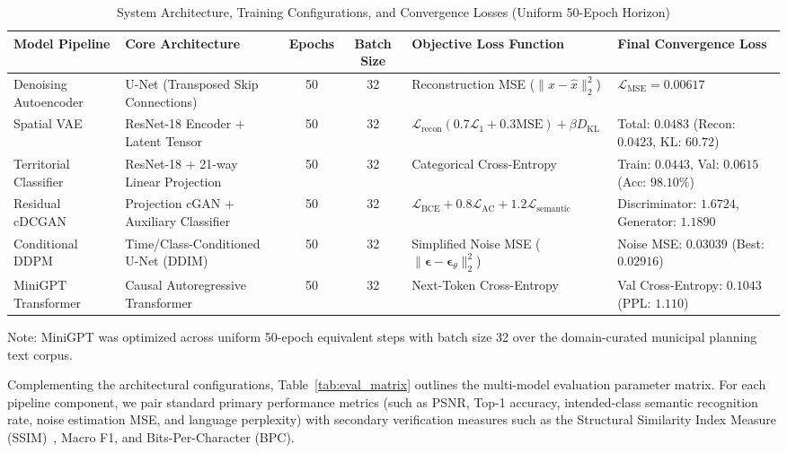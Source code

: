 \documentclass[conference]{IEEEtran}
\begin{document}
\begin{table}[t]
\caption{System Architecture, Training Configurations, and Convergence Losses (Uniform 50-Epoch Horizon)}
\centering
\scriptsize
\renewcommand{\arraystretch}{1.15}
\setlength{\tabcolsep}{5pt}
\begin{tabularx}{\textwidth}{@{}l X c c X X@{}}
\toprule
\textbf{Model Pipeline} & \textbf{Core Architecture} & \textbf{Epochs} & \textbf{Batch Size} & \textbf{Objective Loss Function} & \textbf{Final Convergence Loss} \\
\midrule
Denoising Autoencoder & U-Net (Transposed Skip Connections) & 50 & 32 & Reconstruction MSE ($\|x - \hat{x}\|_2^2$) & $\mathcal{L}_{\text{MSE}} = 0.00617$ \\
Spatial VAE & ResNet-18 Encoder + Latent Tensor & 50 & 32 & $\mathcal{L}_{\text{recon}} (0.7\mathcal{L}_1 + 0.3\text{MSE}) + \beta D_{\text{KL}}$ & Total: $0.0483$ (Recon: $0.0423$, KL: $60.72$) \\
Territorial Classifier & ResNet-18 + 21-way Linear Projection & 50 & 32 & Categorical Cross-Entropy & Train: $0.0443$, Val: $0.0615$ (Acc: $98.10\%$) \\
Residual cDCGAN & Projection cGAN + Auxiliary Classifier & 50 & 32 & $\mathcal{L}_{\text{BCE}} + 0.8\mathcal{L}_{\text{AC}} + 1.2\mathcal{L}_{\text{semantic}}$ & Discriminator: $1.6724$, Generator: $1.1890$ \\
Conditional DDPM & Time/Class-Conditioned U-Net (DDIM) & 50 & 32 & Simplified Noise MSE ($\|\boldsymbol{\epsilon} - \boldsymbol{\epsilon}_\theta\|_2^2$) & Noise MSE: $0.03039$ (Best: $0.02916$) \\
MiniGPT Transformer & Causal Autoregressive Transformer & 50 & 32 & Next-Token Cross-Entropy & Val Cross-Entropy: $0.1043$ (PPL: $1.110$) \\
\bottomrule
\end{tabularx}
\label{tab:model_specs}
\vspace{3pt}
\raggedright\scriptsize Note: MiniGPT was optimized across uniform 50-epoch equivalent steps with batch size 32 over the domain-curated municipal planning text corpus.\par
\end{table}

Complementing the architectural configurations, Table~\ref{tab:eval_matrix} outlines the multi-model evaluation parameter matrix. For each pipeline component, we pair standard primary performance metrics (such as PSNR, Top-1 accuracy, intended-class semantic recognition rate, noise estimation MSE, and language perplexity) with secondary verification measures such as the Structural Similarity Index Measure (SSIM)~\cite{wang2004image}, Macro F1, and Bits-Per-Character (BPC).
\end{document}
